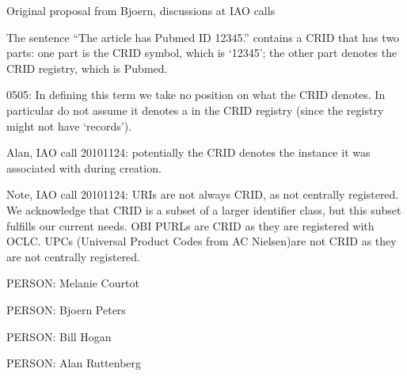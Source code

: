 \documentclass[letterpaper,10pt,english]{sphinxmanual}
\begin{document}
\begin{sphinxShadowBox}

\sphinxAtStartPar
Original proposal from Bjoern, discussions at IAO calls
\end{sphinxShadowBox}

\begin{sphinxShadowBox}

\sphinxAtStartPar
The sentence “The article has Pubmed ID 12345.” contains a CRID that has two parts: one part is the CRID symbol, which is ‘12345’; the other part denotes the CRID registry, which is Pubmed.
\end{sphinxShadowBox}

\begin{sphinxShadowBox}

\sphinxhyphen{}05\sphinxhyphen{}05: In defining this term we take no position on what the CRID denotes. In particular do not assume it denotes a  in the CRID registry (since the registry might not have ‘records’).

\sphinxAtStartPar
Alan, IAO call 20101124: potentially the CRID denotes the instance it was associated with during creation.

\sphinxAtStartPar
Note, IAO call 20101124: URIs are not always CRID, as not centrally registered. We acknowledge that CRID is a subset of a larger identifier class, but this subset fulfills our current needs. OBI PURLs are CRID as they are registered with OCLC. UPCs (Universal Product Codes from AC Nielsen)are not CRID as they are not centrally registered.
\end{sphinxShadowBox}

\begin{sphinxShadowBox}

\sphinxAtStartPar
{}
\end{sphinxShadowBox}

\begin{sphinxShadowBox}

\sphinxAtStartPar
PERSON: Melanie Courtot

\sphinxAtStartPar
PERSON: Bjoern Peters

\sphinxAtStartPar
PERSON: Bill Hogan

\sphinxAtStartPar
PERSON: Alan Ruttenberg
\end{sphinxShadowBox}
\begin{quote}

\ignorespaces \end{quote}
\end{document}
